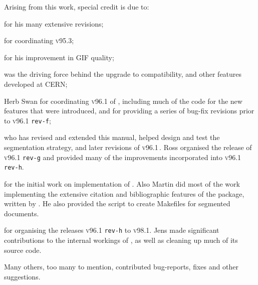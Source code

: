 \bigskip\noindent
Arising from this work, special credit is due to:
\begin{htmllist}
\item [\Hennecke] 
for his many extensive revisions;

\item [\Noworolski] 
for coordinating \textsc{v95.3};

\item [\Isani] 
for his improvement in GIF quality;

%
\item [\Goossens] 
was the driving force behind the upgrade to \LaTeXe{} compatibility,
and other features developed at CERN;

\item [Herb Swan] 
for coordinating \textsc{v96.1} of \latextohtml,
including much of the \Perl{} code
for the new features that were introduced,
and for providing a series of bug-fix revisions
prior to  \textsc{v96.1} \texttt{rev-f};

\item [\RossMoore] 
who has revised and extended this manual, helped design and test the
segmentation strategy, and later revisions of \textsc{v96.1}\,.
Ross organised the release of \textsc{v96.1} \texttt{rev-g}
and provided many of the improvements
incorporated into \textsc{v96.1} \texttt{rev-h}.

\item [\Wilck] 
for the initial work on implementation of .
Also Martin did most of the work implementing the extensive citation and
bibliographic features of the  package, written by \PatrickDaly.
He also provided the  \Perl{} script to create Makefiles
for segmented documents.

\item [\Lippmann] 
for organising the releases \textsc{v96.1} \texttt{rev-h} to \textsc{v98.1}.
Jens made significant contributions to
the internal workings of \latextohtml,
as well as cleaning up much of its source code.
\end{htmllist}

\htmlrule


\bigskip\noindent
Many others, too many to mention, contributed bug-reports,
fixes and other suggestions.

